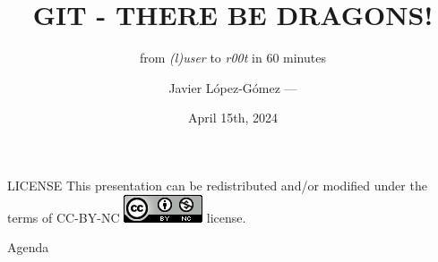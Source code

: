 \documentclass[aspectratio=169]{beamer}
\title{\uppercase{Git - There be dragons!}}
\subtitle{from \emph{(l)user} to \emph{r00t} in 60 minutes}
\author{Javier López-Gómez --- \protect{\tiny\url{https://jalopezg.dev/}}}
\institute{Senior Compiler Engineer ---Zimperium, Inc.}
\date{April 15th, 2024}
\makeatletter
\let\@@TOC=\tableofcontents
\def\tableofcontents[#1]{\bgroup\parskip=0pt\@@TOC[#1]\egroup}
\makeatother
\begin{document}
\maketitle
\begin{frame}{LICENSE}
  \centering This presentation can be redistributed and/or modified under the terms of CC-BY-NC \includegraphics[height=.5\baselineskip]{img/LICENSE.png} license.
\end{frame}
\begin{frame}{Agenda}
  \tableofcontents[hidesubsections]
\end{frame}








\end{document}

